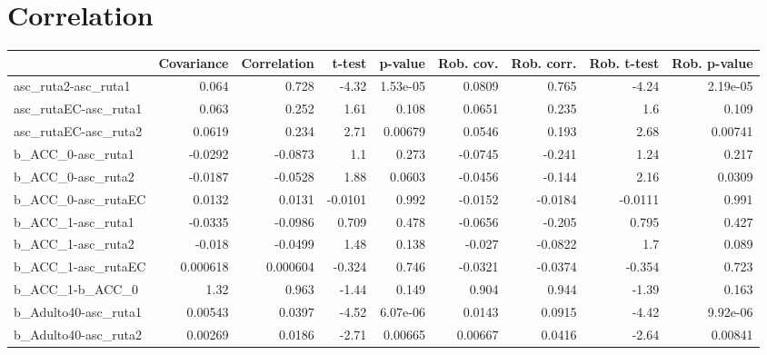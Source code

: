 \section{Correlation}
\begin{tabular}{lrrrrrrrr}
\toprule
{} &  Covariance &  Correlation &   t-test &  p-value &  Rob. cov. &  Rob. corr. &  Rob. t-test &  Rob. p-value \\
\midrule
asc\_ruta2-asc\_ruta1        &       0.064 &        0.728 &    -4.32 & 1.53e-05 &     0.0809 &       0.765 &        -4.24 &      2.19e-05 \\
asc\_rutaEC-asc\_ruta1       &       0.063 &        0.252 &     1.61 &    0.108 &     0.0651 &       0.235 &          1.6 &         0.109 \\
asc\_rutaEC-asc\_ruta2       &      0.0619 &        0.234 &     2.71 &  0.00679 &     0.0546 &       0.193 &         2.68 &       0.00741 \\
b\_ACC\_0-asc\_ruta1          &     -0.0292 &      -0.0873 &      1.1 &    0.273 &    -0.0745 &      -0.241 &         1.24 &         0.217 \\
b\_ACC\_0-asc\_ruta2          &     -0.0187 &      -0.0528 &     1.88 &   0.0603 &    -0.0456 &      -0.144 &         2.16 &        0.0309 \\
b\_ACC\_0-asc\_rutaEC         &      0.0132 &       0.0131 &  -0.0101 &    0.992 &    -0.0152 &     -0.0184 &      -0.0111 &         0.991 \\
b\_ACC\_1-asc\_ruta1          &     -0.0335 &      -0.0986 &    0.709 &    0.478 &    -0.0656 &      -0.205 &        0.795 &         0.427 \\
b\_ACC\_1-asc\_ruta2          &      -0.018 &      -0.0499 &     1.48 &    0.138 &     -0.027 &     -0.0822 &          1.7 &         0.089 \\
b\_ACC\_1-asc\_rutaEC         &    0.000618 &     0.000604 &   -0.324 &    0.746 &    -0.0321 &     -0.0374 &       -0.354 &         0.723 \\
b\_ACC\_1-b\_ACC\_0            &        1.32 &        0.963 &    -1.44 &    0.149 &      0.904 &       0.944 &        -1.39 &         0.163 \\
b\_Adulto40-asc\_ruta1       &     0.00543 &       0.0397 &    -4.52 & 6.07e-06 &     0.0143 &      0.0915 &        -4.42 &      9.92e-06 \\
b\_Adulto40-asc\_ruta2       &     0.00269 &       0.0186 &    -2.71 &  0.00665 &    0.00667 &      0.0416 &        -2.64 &       0.00841 \\

\end{tabular}

